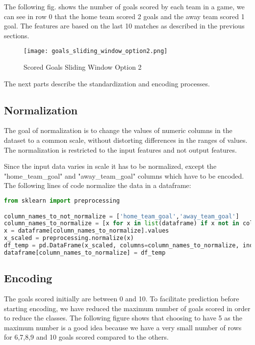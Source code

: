 The following fig. shows the number of goals scored by each team in a game, we can see in row 0 that the home team scored 2 goals and the away team scored 1 goal. The features are based on the last 10 matches as described in the previous sections.


\begin{figure}[H]
\begin{center}
\texttt{[image: goals\_sliding\_window\_option2.png]}
\end{center}
\caption{Scored Goals Sliding Window Option 2}
\label{fig:scored_sliding_window_option2}
\end{figure}

The next parts describe the standardization and encoding processes.


\subsection {Normalization}
The goal of normalization is to change the values of numeric columns in the dataset to a common scale, without distorting differences in the ranges of values. The normalization is restricted to the input features and not output features.

Since the input data varies in scale it has to be normalized, except the "home\_team\_goal" and "away\_team\_goal" columns which have to be encoded.
The following lines of code normalize the data in a dataframe:

\begin{lstlisting}[language=Python, caption=Scored goals Python code for normalization]
from sklearn import preprocessing

column_names_to_not_normalize = ['home_team_goal','away_team_goal']
column_names_to_normalize = [x for x in list(dataframe) if x not in column_names_to_not_normalize ]
x = dataframe[column_names_to_normalize].values
x_scaled = preprocessing.normalize(x)
df_temp = pd.DataFrame(x_scaled, columns=column_names_to_normalize, index = dataframe.index)
dataframe[column_names_to_normalize] = df_temp
\end{lstlisting}


\subsection {Encoding}

The goals scored initially are between 0 and 10.
To facilitate prediction before starting encoding, we have reduced the maximum number of goals scored in order to reduce the classes. The following figure shows that choosing to have 5 as the maximum number is a good idea because we have a very small number of rows for 6,7,8,9 and 10 goals scored compared to the others.

